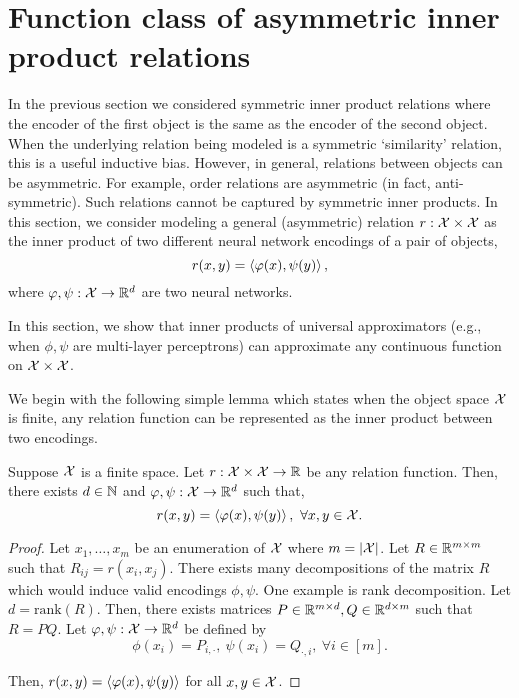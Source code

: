 \section{Function class of asymmetric inner product relations}\label{sec:asymmetric_relations}

In the previous section we considered symmetric inner product relations where the encoder of the first object is the same as the encoder of the second object. When the underlying relation being modeled is a symmetric `similarity' relation, this is a useful inductive bias. However, in general, relations between objects can be asymmetric. For example, order relations are asymmetric (in fact, anti-symmetric). Such relations cannot be captured by symmetric inner products. In this section, we consider modeling a general (asymmetric) relation $r: {\mathcal{X}} \times {\mathcal{X}}$ as the inner product of two different neural network encodings of a pair of objects,
\begin{equation}\label{eq:asymmetric_iprod_relation}
    r(x, y) = \iprod{\phi(x)}{\psi(y)},
\end{equation}
where $\varphi, \psi: {\mathcal{X}} \to \mathbb{R}^d$ are two neural networks.

In this section, we show that inner products of universal approximators (e.g., when $\phi, \psi$ are multi-layer perceptrons) can approximate any continuous function on ${\mathcal{X}} \times {\mathcal{X}}$.

We begin with the following simple lemma which states when the object space ${\mathcal{X}}$ is finite, any relation function can be represented as the inner product between two encodings.

\begin{lemma}\label{lemma:finite_space_rel}
    Suppose ${\mathcal{X}}$ is a finite space. Let $r: {\mathcal{X}} \times {\mathcal{X}} \to \mathbb{R}$ be any relation function. Then, there exists $d \in {\mathbb{N}}$ and $\varphi, \psi : {\mathcal{X}} \to \mathbb{R}^{d}$ such that,
    \begin{equation*}
        r(x, y) = \iprod{\phi(x)}{\psi(y)}, \ \forall x, y \in \calX.
    \end{equation*}
\end{lemma}

\begin{proof}
    Let $x_1, \ldots, x_m$ be an enumeration of ${\mathcal{X}}$ where $m = \left\lvert{\mathcal{X}}\right\rvert$. Let $R \in \mathbb{R}^{m \times m}$ such that $R_{ij} = r(x_i, x_j)$. There exists many decompositions of the matrix $R$ which would induce valid encodings $\phi, \psi$. One example is rank decomposition. Let $d = \mathrm{rank}(R)$. Then, there exists matrices $P \in \mathbb{R}^{m \times d}, Q \in \mathbb{R}^{d \times m}$ such that $R = P Q$. Let $\varphi, \psi: {\mathcal{X}} \to \mathbb{R}^{d}$ be defined by
    \begin{equation}
        \phi(x_i) = P_{i, \cdot}, \ \psi(x_i) = Q_{\cdot, i}, \ \forall i \in [m].
    \end{equation}

    Then, $r(x, y) = \left \langle \varphi(x), \psi(y) \right\rangle$ for all $x, y \in {\mathcal{X}}$.
\end{proof}


